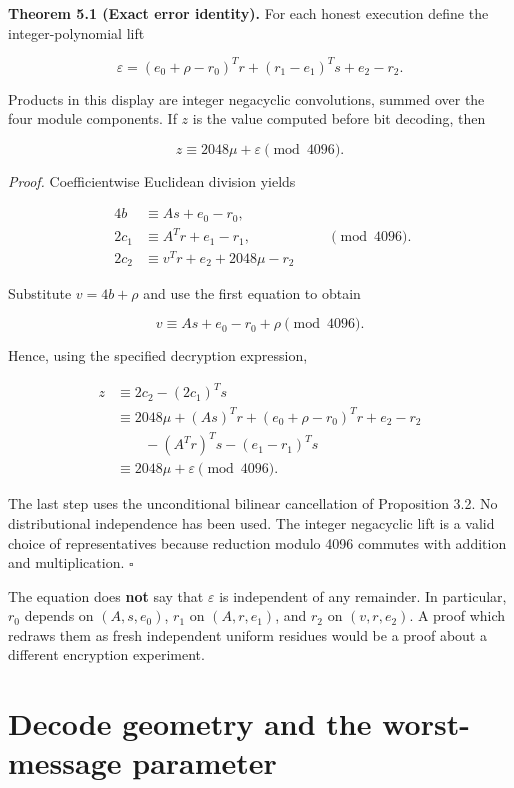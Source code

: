 \documentclass[
  11pt,
  a4paper,
  oneside]{report}
\begin{document}
\textbf{Theorem 5.1 (Exact error identity).} For each honest execution
define the integer-polynomial lift

\[
\boxed{\ 
\varepsilon=(e_0+\rho-r_0)^Tr
+(r_1-e_1)^Ts+e_2-r_2.
\ }
\]

Products in this display are integer negacyclic convolutions, summed
over the four module components. If \(z\) is the value computed before
bit decoding, then

\[
\boxed{\ z\equiv 2048\mu+\varepsilon\pmod{4096}.\ }
\]

\emph{Proof.} Coefficientwise Euclidean division yields

\[
\begin{aligned}
4b&\equiv As+e_0-r_0,\\
2c_1&\equiv A^Tr+e_1-r_1,\\
2c_2&\equiv v^Tr+e_2+2048\mu-r_2
\end{aligned}\qquad\pmod{4096}.
\]

Substitute \(v=4b+\rho\) and use the first equation to obtain

\[
v\equiv As+e_0-r_0+\rho\pmod{4096}.
\]

Hence, using the specified decryption expression,

\[
\begin{aligned}
z&\equiv 2c_2-(2c_1)^Ts\\
&\equiv 2048\mu+(As)^Tr+(e_0+\rho-r_0)^Tr
+e_2-r_2\\
&\qquad -(A^Tr)^Ts-(e_1-r_1)^Ts\\
&\equiv 2048\mu+\varepsilon\pmod{4096}.
\end{aligned}
\]

The last step uses the unconditional bilinear cancellation of
Proposition 3.2. No distributional independence has been used. The
integer negacyclic lift is a valid choice of representatives because
reduction modulo 4096 commutes with addition and multiplication.
\(\square\)

The equation does \textbf{not} say that \(\varepsilon\) is independent
of any remainder. In particular, \(r_0\) depends on \((A,s,e_0)\),
\(r_1\) on \((A,r,e_1)\), and \(r_2\) on \((v,r,e_2)\). A proof which
redraws them as fresh independent uniform residues would be a proof
about a different encryption experiment.

\section{Decode geometry and the worst-message
parameter}\label{decode-geometry-and-the-worst-message-parameter}
\end{document}
